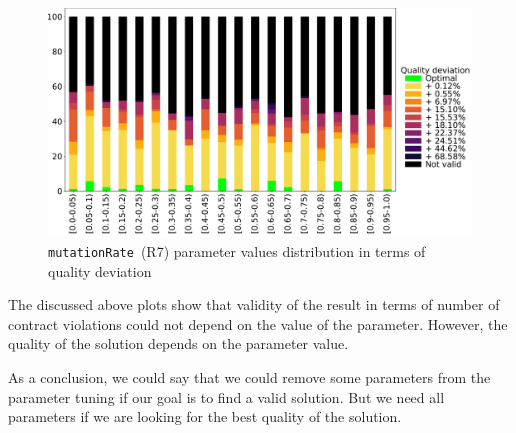 \begin{figure}
	\centering
	\includegraphics[width=\textwidth]{images/mutationRateObjective.pdf}
	\caption[\texttt{mutationRate}~(R7) parameter values distribution in terms of quality deviation]{\texttt{mutationRate}~(R7) parameter values distribution in terms of quality deviation}
	\label{fig:mutationRateObjective}
\end{figure}

The discussed above plots show that validity of the result in terms of number of contract violations could not depend on the value of the parameter. However, the quality of the solution depends on the parameter value. 

As a conclusion, we could say that we could remove some parameters from the parameter tuning if our goal is to find a valid solution. But we need all parameters if we are looking for the best quality of the solution.